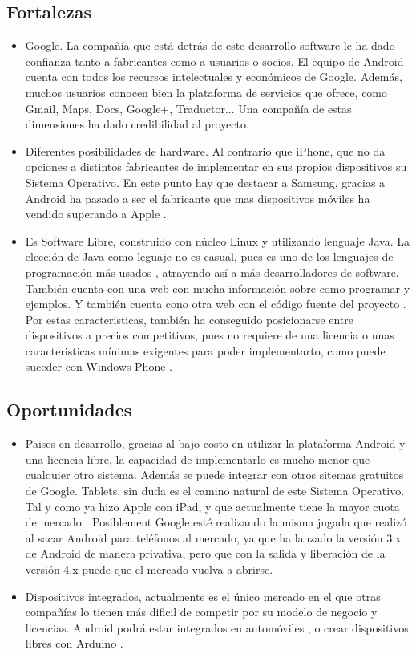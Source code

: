 \documentclass[11pt]{article}
\begin{document}
\subsection{Fortalezas}
\begin{itemize}
\item Google. La compañía que está detrás de este desarrollo software le ha dado confianza tanto a fabricantes como a usuarios o socios. El equipo de Android cuenta con todos los recursos intelectuales y económicos de Google. Además, muchos usuarios conocen bien la plataforma de servicios que ofrece, como Gmail, Maps, Docs, Google+, Traductor... Una compañía de estas dimensiones ha dado credibilidad al proyecto. 
\item Diferentes posibilidades de hardware. Al contrario que iPhone, que no da opciones a distintos fabricantes de implementar en sus propios dispositivos su Sistema Operativo. En este punto hay que destacar a Samsung, gracias a Android ha pasado a ser el fabricante que mas dispositivos móviles ha vendido superando a Apple \cite{samsungSellMoreApple}.
\item Es Software Libre, construido con núcleo Linux y utilizando lenguaje Java. La elección de Java como leguaje no es casual, pues es uno de los lenguajes de programación más usados \cite{tiobe}, atrayendo así a más desarrolladores de software. También cuenta con una web \cite{developerAndroid} con mucha información sobre como programar y ejemplos. Y también cuenta cono otra web con el código fuente del proyecto \cite{sourceAndroid}. Por estas caracteristicas, también ha conseguido posicionarse entre dispositivos a precios competitivos, pues no requiere de una licencia o unas caracteristicas mínimas exigentes para poder implementarto, como puede suceder con Windows Phone \cite{windowsPhoneRequirements}.
\end{itemize}

\subsection{Oportunidades}
\begin{itemize}
\item Paises en desarrollo, gracias al bajo costo en utilizar la plataforma Android y una licencia libre, la capacidad de implementarlo es mucho menor que cualquier otro sistema. Además se puede integrar con otros sitemas gratuitos de Google.
Tablets, sin duda es el camino natural de este Sistema Operativo. Tal y como ya hizo Apple con iPad, y que actualmente tiene la mayor cuota de mercado \cite{appleShare2011}. Posiblement Google esté realizando la misma jugada que realizó al sacar Android para teléfonos al mercado, ya que ha lanzado la versión 3.x de Android de manera privativa, pero que con la salida y liberación de la versión 4.x puede que el mercado vuelva a abrirse.
\item Dispositivos integrados, actualmente es el único mercado en el que otras compañías lo tienen más dificil de competir por su modelo de negocio y licencias. Android podrá estar integrados en automóviles \cite{engadgetNews}, o crear dispositivos libres con Arduino \cite{arduinoAndroid}.
\end{itemize}
\end{document}
